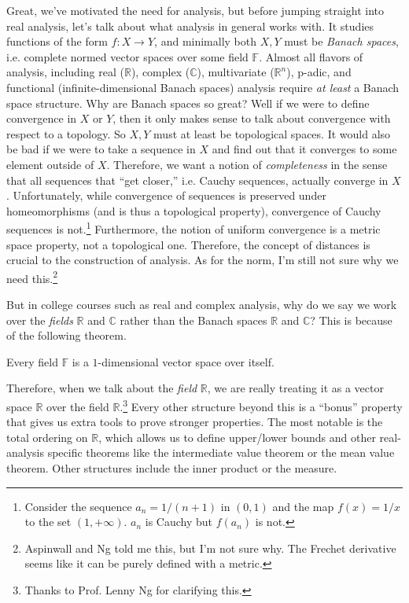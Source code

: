 Great, we've motivated the need for analysis, but before jumping straight into real analysis, let's talk about what analysis in general works with. It studies functions of the form $f: X \rightarrow Y$, and minimally both $X, Y$ must be \textit{Banach spaces}, i.e. complete normed vector spaces over some field $\mathbb{F}$. Almost all flavors of analysis, including real ($\mathbb{R}$), complex ($\mathbb{C}$), multivariate ($\mathbb{R}^n$), p-adic, and functional (infinite-dimensional Banach spaces) analysis require \textit{at least} a Banach space structure. Why are Banach spaces so great? Well if we were to define convergence in $X$ or $Y$, then it only makes sense to talk about convergence with respect to a topology. So $X, Y$ must at least be topological spaces. It would also be bad if we were to take a sequence in $X$ and find out that it converges to some element outside of $X$. Therefore, we want a notion of \textit{completeness} in the sense that all sequences that ``get closer,'' i.e. Cauchy sequences, actually converge in $X$. Unfortunately, while convergence of sequences is preserved under homeomorphisms (and is thus a topological property), convergence of Cauchy sequences is not.\footnote{Consider the sequence $a_n = 1/(n+1)$ in $(0, 1)$ and the map $f(x) = 1/x$ to the set $(1, +\infty)$. $a_n$ is Cauchy but $f(a_n)$ is not.} Furthermore, the notion of uniform convergence is a metric space property, not a topological one. Therefore, the concept of distances is crucial to the construction of analysis. As for the norm, I'm still not sure why we need this.\footnote{Aspinwall and Ng told me this, but I'm not sure why. The Frechet derivative seems like it can be purely defined with a metric. } 

But in college courses such as real and complex analysis, why do we say we work over the \textit{fields} $\mathbb{R}$ and $\mathbb{C}$ rather than the Banach spaces $\mathbb{R}$ and $\mathbb{C}$? This is because of the following theorem. 

\begin{theorem}
  Every field $\mathbb{F}$ is a $1$-dimensional vector space over itself. 
\end{theorem}

Therefore, when we talk about the \textit{field} $\mathbb{R}$, we are really treating it as a vector space $\mathbb{R}$ over the field $\mathbb{R}$.\footnote{Thanks to Prof. Lenny Ng for clarifying this.} Every other structure beyond this is a ``bonus'' property that gives us extra tools to prove stronger properties. The most notable is the total ordering on $\mathbb{R}$, which allows us to define upper/lower bounds and other real-analysis specific theorems like the intermediate value theorem or the mean value theorem. Other structures include the inner product or the measure. 

